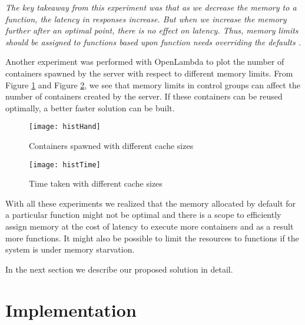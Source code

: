 \documentclass[letterpaper,twocolumn,10pt]{article}
\begin{document}
{\it The key takeaway from this experiment was that as we decrease the memory to a function, the latency in responses increase. But when we increase the memory further after an optimal point, there is no effect on latency. Thus, memory limits should be assigned to functions based upon function needs overriding the defaults .}

Another experiment was performed with OpenLambda\cite{openlambda.wp} to plot the number of containers spawned by the server with respect to different memory limits. From Figure \ref{fig:Figure4} and Figure \ref{fig:Figure5}, we see that memory limits in control groups can affect the number of containers created by the server. If these containers can be reused optimally, a better faster solution can be built.

\begin{figure}[H]
\texttt{[image: histHand]}
    \caption{Containers spawned with different cache sizes}
    \label{fig:Figure4}
\end{figure}

\begin{figure}[H]
\texttt{[image: histTime]}
    \caption{Time taken with different cache sizes}
    \label{fig:Figure5}
\end{figure}

With all these experiments we realized that the memory allocated by default for a particular function might not be optimal and there is a scope to efficiently assign memory at the cost of latency to execute more containers and as a result more functions. It might also be possible to limit the resources to functions if the system is under memory starvation. 

In the next section we describe our proposed solution in detail. 
\section{Implementation}
\label{sec:second}
\end{document}
